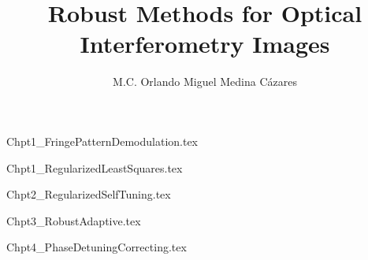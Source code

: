 \documentclass[letterpaper,12pt]{book}
\title{Robust Methods for Optical Interferometry Images}
\author{M.C. Orlando Miguel Medina C\'azares}
\begin{document}
\maketitle

\clearpage
\thispagestyle{empty}

\tableofcontents
{}
\listoffigures

\mainmatter
{Chpt1_FringePatternDemodulation.tex}

{Chpt1_RegularizedLeastSquares.tex}

{Chpt2_RegularizedSelfTuning.tex}

{Chpt3_RobustAdaptive.tex}

{Chpt4_PhaseDetuningCorrecting.tex}

\medskip

\end{document}
